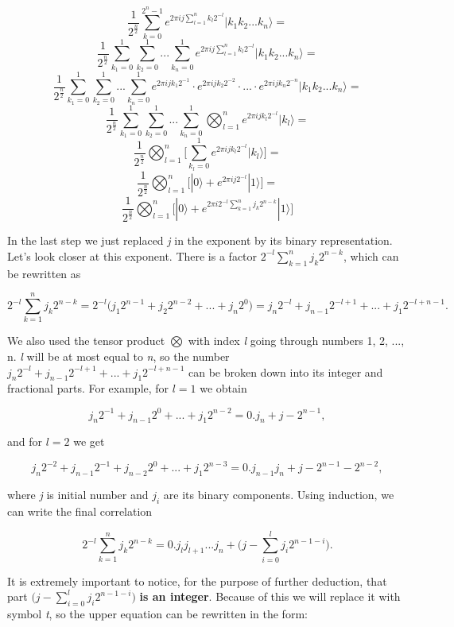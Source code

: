 \[ \frac{1}{2^{\frac{n}{2}}} \sum_{k = 0}^{2^n - 1} e^{2 \pi ij \sum_{l = 1}^{n}k_l 2^{-l}} |k_1 k_2 ... k_n\rangle = \]
\[ \frac{1}{2^{\frac{n}{2}}} \sum_{k_1 = 0}^{1}\sum_{k_2 = 0}^{1} ... \sum_{k_n = 0}^{1} e^{2 \pi ij \sum_{l = 1}^{n}k_l 2^{-l}} |k_1 k_2 ... k_n\rangle = \]
\[ \frac{1}{2^{\frac{n}{2}}} \sum_{k_1 = 0}^{1}\sum_{k_2 = 0}^{1} ... \sum_{k_n = 0}^{1} e^{2 \pi ij k_1 2^{-1}} \cdot e^{2 \pi ij k_2 2^{-2}} \cdot ... \cdot e^{2 \pi ij k_n 2^{-n}} |k_1 k_2 ... k_n\rangle = \]
\[ \frac{1}{2^{\frac{n}{2}}} \sum_{k_1 = 0}^{1}\sum_{k_2 = 0}^{1} ... \sum_{k_n = 0}^{1} \bigotimes_{l = 1}^{n} e^{2 \pi ij k_l 2^{-l}}|k_l\rangle = \]
\[ \frac{1}{2^{\frac{n}{2}}} \bigotimes_{l=1}^{n} \bigg[ \sum_{k_l = 0}^{1} e^{2 \pi ij k_l 2^{-l}}|k_l\rangle \bigg] = \]
\[ \frac{1}{2^{\frac{n}{2}}} \bigotimes_{l=1}^{n} \bigg[ |0\rangle + e^{2 \pi ij 2^{-l}}|1\rangle \bigg] = \]
\[ \frac{1}{2^{\frac{n}{2}}} \bigotimes_{l=1}^{n} \bigg[ |0\rangle + e^{2 \pi i 2^{-l} \sum_{k = 1}^{n}j_k 2^{n - k}}|1\rangle \bigg] \]

In the last step we just replaced \textit{j} in the exponent by its binary representation. Let's look closer at this exponent. There is a factor $2^{-l}\sum_{k = 1}^{n} j_k 2^{n - k}$, which can be rewritten as

\[ 2^{-l}\sum_{k = 1}^{n} j_k 2^{n - k} = 2^{-l} \bigg( j_1 2^{n - 1} + j_2 2^{n - 2} + ... + j_n 2^0 \bigg) = j_n 2^{-l} + j_{n-1} 2^{-l + 1} + ... + j_1 2^{-l + n - 1}.\]

We also used the tensor product $\bigotimes$ with index \textit{l} going through numbers 1, 2, ..., n. \textit{l} will be at most equal to \textit{n}, so the number $j_n 2^{-l} + j_{n-1} 2^{-l + 1} + ... + j_1 2^{-l + n - 1}$ can be broken down into its integer and fractional parts. For example, for $l = 1$ we obtain

\[ j_{n} 2^{-1} + j_{n-1} 2^{0} + ... + j_{1} 2^{n-2} = 0.j_n + j - 2^{n - 1}, \]

and for $l = 2$ we get

\[ j_{n} 2^{-2} + j_{n-1} 2^{-1} + j_{n-2} 2^{0} + ... + j_{1} 2^{n-3} = 0.j_{n-1} j_n + j - 2^{n - 1} - 2^{n - 2}, \]

where \textit{j} is initial number and $j_i$ are its binary components. Using induction, we can write the final correlation

\[ 2^{-l}\sum_{k = 1}^{n} j_k 2^{n - k} = 0.j_l j_{l+1} ... j_n + \bigg(j - \sum_{i = 0}^{l} j_i 2^{n - 1 - i} \bigg).\]

It is extremely important to notice, for the purpose of further deduction, that part $\bigg(j - \sum_{i = 0}^{l} j_i 2^{n - 1 - i} \bigg)$ \textbf{is an integer}. Because of this we will replace it with symbol \textit{t}, so the upper equation can be rewritten in the form:

